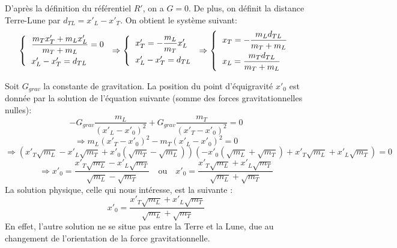 \documentclass[a4paper,12pt,twoside]{article}
\begin{document}
D'après la définition du référentiel $R'$, on a $G = 0$. De plus, on définit la distance Terre-Lune par $d_{TL}=x'_L-x'_T$. On obtient le système suivant:\\

\begin{equation}
\left\{
\begin{tabular}{l}
    $\displaystyle \frac{m_Tx'_T+m_Lx'_L}{m_T+m_L} = 0$ \\[8pt]
    $x'_L - x'_T = d_{TL}$
\end{tabular}
\right.
\Rightarrow
\left\{
\begin{tabular}{l}
    $x'_T = -\displaystyle \frac{m_L}{m_T} x'_L$ \\[8pt]
    $x'_L - x'_T = d_{TL}$
\end{tabular}
\right.
\Rightarrow
\left\{
\begin{tabular}{l}
    $x_T = -\displaystyle \frac{m_Ld_{TL}}{m_T+m_L}$ \\[8pt]
    $x_L = \displaystyle \frac{m_Td_{TL}}{m_T+m_L}$
\end{tabular}
\right.
\end{equation}

Soit $G_{grav}$ la constante de gravitation. La position du point d'équigravité $x'_0$ est donnée par la solution de l'équation suivante (somme des forces gravitationnelles nulles):
\begin{equation}
-G_{grav}\displaystyle \frac{m_L}{(x'_L-x'_0)^2} + G_{grav}\displaystyle \frac{m_T}{(x'_T-x'_0)^2} = 0
\end{equation}
\begin{equation}
\Rightarrow
m_L(x'_T-x'_0)^2-m_T(x'_L-x'_0)^2=0
\end{equation}
\begin{equation}
\Rightarrow
(x'_T\sqrt{m_L}-x'_L\sqrt{m_T}+x'_0(\sqrt{m_T}-\sqrt{m_L}))(-x'_0(\sqrt{m_L}+\sqrt{m_T})+x'_T\sqrt{m_L}+x'_L\sqrt{m_T})=0
\end{equation}
\begin{equation}
\Rightarrow
x'_0 = \displaystyle\frac{x'_T\sqrt{m_L}-x'_L\sqrt{m_T}}{\sqrt{m_L}-\sqrt{m_T}} \quad \text{ou} \quad x'_0 =\displaystyle\frac{x'_T\sqrt{m_L}+x'_L\sqrt{m_T}}{\sqrt{m_L}+\sqrt{m_T}}
\end{equation}
La solution physique, celle qui nous intéresse, est la suivante :
\begin{equation}
x'_0 =\displaystyle\frac{x'_T\sqrt{m_L}+x'_L\sqrt{m_T}}{\sqrt{m_L}+\sqrt{m_T}}
\end{equation}
En effet, l'autre solution ne se situe pas entre la Terre et la Lune, due au changement de l'orientation de la force gravitationnelle.
\end{document}
